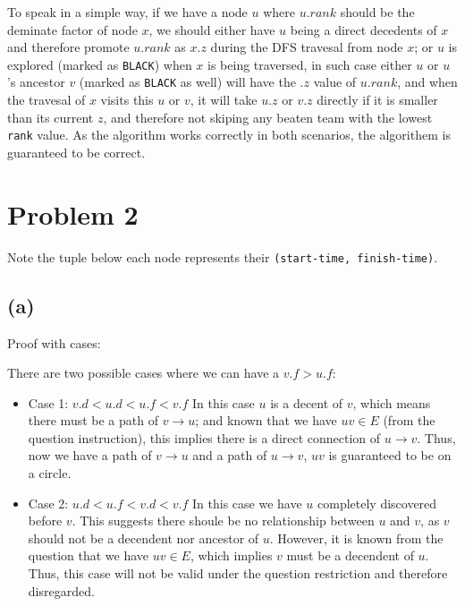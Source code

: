 \documentclass[11pt]{article}
\newcommand{\ilc}{\texttt}
\begin{document}
To speak in a simple way, if we have a node $u$ where $u.rank$ should be the deminate factor of node $x$, we should either have $u$ being a direct decedents of $x$ and therefore promote $u.rank$ as $x.z$ during the DFS travesal from node $x$; or $u$ is explored (marked as \ilc{BLACK}) when $x$ is being traversed, in such case either $u$ or $u$'s ancestor $v$ (marked as \ilc{BLACK} as well) will have the $.z$ value of $u.rank$, and when the travesal of $x$ visits this $u$ or $v$, it will take $u.z$ or $v.z$ directly if it is smaller than its current $z$, and therefore not skiping any beaten team with the lowest \ilc{rank} value. As the algorithm works correctly in both scenarios, the algorithem is guaranteed to be correct.


\section{Problem 2}

Note the tuple below each node represents their \ilc{(start-time, finish-time)}.

\subsection{(a)}

Proof with cases:

There are two possible cases where we can have a $v.f > u.f$:

\begin{itemize}
    \item Case 1: $v.d < u.d < u.f < v.f$\newline
    In this case $u$ is a decent of $v$, which means there must be a path of $v \rightarrow u$; and known that we have $uv \in E$ (from the question instruction), this implies there is a direct connection of $u \rightarrow v$. Thus, now we have a path of $v \rightarrow u$ and a path of $u \rightarrow v$, $uv$ is guaranteed to be on a circle.
    \item Case 2: $u.d < u.f < v.d < v.f$\newline
    In this case we have $u$ completely discovered before $v$. This suggests there shoule be no relationship between $u$ and $v$, as $v$ should not be a decendent nor ancestor of $u$. However, it is known from the question that we have $uv \in E$, which implies $v$ must be a decendent of $u$. Thus, this case will not be valid under the question restriction and therefore disregarded.
\end{itemize}
\end{document}
